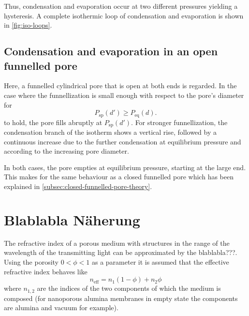\documentclass[../thesis.tex]{subfiles}
\begin{document}
        Thus, condensation and evaporation occur at two different pressures yielding a hysteresis. A complete isothermic loop of condensation and evaporation is shown in \cref{fig:iso-loops}.


      \subsection{Condensation and evaporation in an open funnelled pore}
      \label{subsec:open-funnelled-pore-theory}

      Here, a funnelled cylindrical pore that is open at both ends is regarded. In the case where the funnellization is small enough with respect to the pore's diameter for
      \begin{equation*}
          P_\mathrm{sp}(d')\ge P_\mathrm{eq}(d).
          \label{eq:open-fun-pore-precond}
      \end{equation*}
      to hold, the pore fills abruptly at $P_\mathrm{sp}(d')$. For stronger funnellization, the condensation branch of the isotherm shows a vertical rise, followed by a continuous increase due to the further condensation at equilibrium pressure and according to the increasing pore diameter.

      In both cases, the pore empties at equilibrium pressure, starting at the large end. This makes for the same behaviour as a closed funnelled pore which has been explained in \cref{subsec:closed-funnelled-pore-theory}.

      



    \section{Blablabla Näherung}
    \label{sec:porous-transmission}

      The refractive index of a porous medium with structures in the range of the wavelength of the transmitting light can be approximated by the blablabla???. Using the porosity $0<\phi<1$ as a parameter it is assumed that the effective refractive index behaves like
      \begin{equation*}
        n_\mathrm{eff} = n_1 \left(1-\phi\right) + n_2 \phi
        \label{eq:porous-transmission-approximation}
      \end{equation*}
      where $n_{1,2}$ are the indices of the two components of which the medium is composed (for nanoporous alumina membranes in empty state the components are alumina and vacuum for example).
\end{document}
